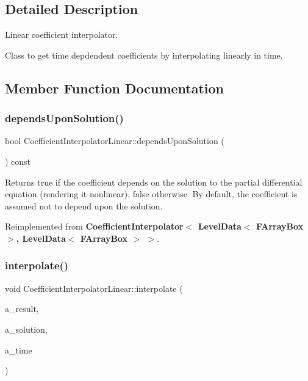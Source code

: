 \subsection{Detailed Description}
Linear coefficient interpolator. 

Class to get time depdendent coefficients by interpolating linearly in time. 

\subsection{Member Function Documentation}
\mbox{\label{class_coefficient_interpolator_linear_a649a101d1f3608951470426a47bc4c54}} 
\subsubsection{\texorpdfstring{depends\+Upon\+Solution()}{dependsUponSolution()}}
{\footnotesize\ttfamily bool Coefficient\+Interpolator\+Linear\+::depends\+Upon\+Solution (\begin{DoxyParamCaption}{ }\end{DoxyParamCaption}) const\hspace{0.3cm}{\ttfamily [virtual]}}

Returns true if the coefficient depends on the solution to the partial differential equation (rendering it nonlinear), false otherwise. By default, the coefficient is assumed not to depend upon the solution. 

Reimplemented from \textbf{ Coefficient\+Interpolator$<$ Level\+Data$<$ F\+Array\+Box $>$, Level\+Data$<$ F\+Array\+Box $>$ $>$}.

\mbox{\label{class_coefficient_interpolator_linear_a7558771f5d460bb587cc8f90c0156b1f}} 
\subsubsection{\texorpdfstring{interpolate()}{interpolate()}}
{\footnotesize\ttfamily void Coefficient\+Interpolator\+Linear\+::interpolate (\begin{DoxyParamCaption}\item[{\textbf{ Level\+Data}$<$ \textbf{ F\+Array\+Box} $>$ \&}]{a\+\_\+result,  }\item[{const \textbf{ Level\+Data}$<$ \textbf{ F\+Array\+Box} $>$ \&}]{a\+\_\+solution,  }\item[{\textbf{ Real}}]{a\+\_\+time }\end{DoxyParamCaption})\hspace{0.3cm}{\ttfamily [virtual]}}

